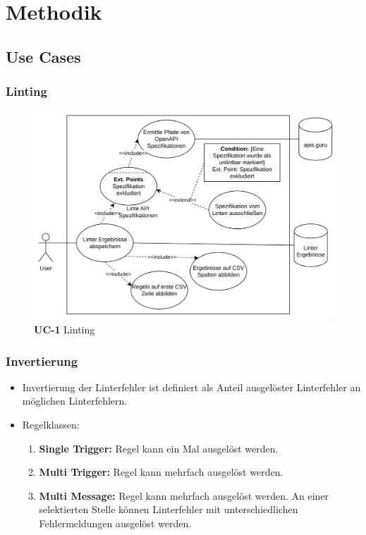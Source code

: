 \section{Methodik}
\subsection{Use Cases}
\begin{frame}
  \frametitle{Linting}
  \vspace{-0.5cm}
  \begin{figure}[htbp]
    \centering
    \includegraphics[width=0.9\linewidth]{img/defense-linting.png}
    \caption{\textbf{UC-1} Linting}
    \label{fig:linting}
  \end{figure}
\end{frame}

\begin{frame}
  \frametitle{Invertierung}
  \begin{itemize}
    \item Invertierung der Linterfehler ist definiert als Anteil ausgelöster Linterfehler an möglichen Linterfehlern.
    \item Regelklassen:
    \begin{enumerate}
      \item \textbf{Single Trigger:} Regel kann ein Mal ausgelöst werden.
      \item \textbf{Multi Trigger:} Regel kann mehrfach ausgelöst werden.
      \item \textbf{Multi Message:} Regel kann mehrfach ausgelöst werden. An einer selektierten Stelle können Linterfehler mit unterschiedlichen Fehlermeldungen ausgelöst werden.
    \end{enumerate}
  \end{itemize}
\end{frame}

